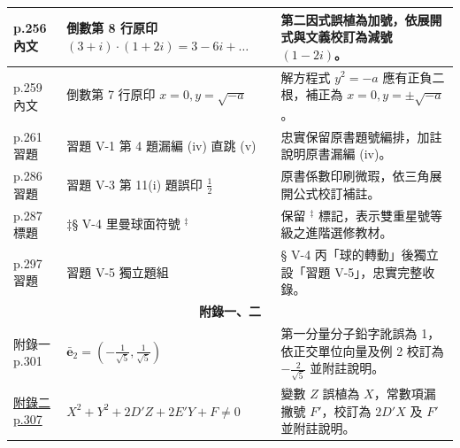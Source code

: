\documentclass[a4paper,12pt,twoside]{article}
\begin{document}
\begin{table}[H]
\begin{tabularx}{\textwidth}{|p{3.0cm}|p{3.8cm}|X|}
p.256 內文 & 倒數第 8 行原印 $(3+i)\cdot(1+2i) = 3-6i+\dots$ & 第二因式誤植為加號，依展開式與文義校訂為減號 $(1-2i)$。 \\ \hline
p.259 內文 & 倒數第 7 行原印 $x=0, y=\sqrt{-a}$ & 解方程式 $y^2 = -a$ 應有正負二根，補正為 $x=0, y=\pm\sqrt{-a}$。 \\ \hline
p.261 習題 & 習題 V-1 第 4 題漏編 (iv) 直跳 (v) & 忠實保留原書題號編排，加註說明原書漏編 (iv)。 \\ \hline
p.286 習題 & 習題 V-3 第 11(i) 題誤印 $\frac{1}{2}$ & 原書係數印刷微瑕，依三角展開公式校訂補註。 \\ \hline
p.287 標題 & ‡§ V-4 里曼球面符號 ${}^\ddagger$ & 保留 ${}^\ddagger$ 標記，表示雙重星號等級之進階選修教材。 \\ \hline
p.297 習題 & 習題 V-5 獨立題組 & § V-4 丙「球的轉動」後獨立設「習題 V-5」，忠實完整收錄。 \\ \hline

\multicolumn{3}{|c|}{\textbf{附錄一、二}} \\ \hline

附錄一 p.301 & $\bar{\mathbf{e}}_2 = (-\frac{1}{\sqrt{5}}, \frac{1}{\sqrt{5}})$ & 第一分量分子鉛字訛誤為 1，依正交單位向量及例 2 校訂為 $-\frac{2}{\sqrt{5}}$ 並附註說明。 \\ \hline
\hyperref[note:b4-a2-p307-typo]{附錄二 p.307} & $X^2+Y^2+2D'Z+2E'Y+F \neq 0$ & 變數 $Z$ 誤植為 $X$，常數項漏撇號 $F'$，校訂為 $2D'X$ 及 $F'$ 並附註說明。 \\ \hline

\end{tabularx}
\end{table}

\clearpage


\clearpage
\tableofcontents
\newpage

\end{document}

